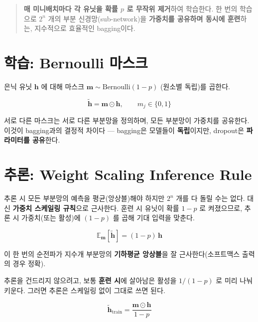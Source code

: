 \documentclass[
  letterpaper,
  DIV=11,
  numbers=noendperiod]{scrreprt}
\begin{document}
\begin{quote}
\textbf{매 미니배치마다 각 유닛을 확률 \(p\) 로 무작위 제거}하여
학습한다. 한 번의 학습으로 \(2^n\) 개의 부분 신경망(sub-network)을
\textbf{가중치를 공유하며 동시에 훈련}하는, 지수적으로 효율적인
bagging이다.
\end{quote}

\section{학습: Bernoulli
마스크}\label{uxd559uxc2b5-bernoulli-uxb9c8uxc2a4uxd06c}

은닉 유닛 \(\bm{h}\) 에 대해 마스크 \(\bm{m}\sim\text{Bernoulli}(1-p)\)
(원소별 독립)를 곱한다.

\[
\tilde{\bm{h}} = \bm{m}\odot\bm{h}, \qquad m_j\in\{0,1\}
\]

서로 다른 마스크는 서로 다른 부분망을 정의하며, 모든 부분망이 가중치를
공유한다. 이것이 bagging과의 결정적 차이다 --- bagging은 모델들이
\textbf{독립}이지만, dropout은 \textbf{파라미터를 공유}한다.

\section{추론: Weight Scaling Inference
Rule}\label{uxcd94uxb860-weight-scaling-inference-rule}

추론 시 모든 부분망의 예측을 평균(앙상블)해야 하지만 \(2^n\) 개를 다
돌릴 수는 없다. 대신 \textbf{가중치 스케일링 규칙}으로 근사한다. 훈련 시
유닛이 확률 \(1-p\) 로 켜졌으므로, 추론 시 가중치(또는 활성)에 \((1-p)\)
를 곱해 기대 입력을 맞춘다.

\[
\mathbb{E}_{\bm{m}}[\tilde{\bm{h}}] = (1-p)\,\bm{h}
\]

이 한 번의 순전파가 지수개 부분망의 \textbf{기하평균 앙상블}을 잘
근사한다(소프트맥스 출력의 경우 정확).

\begin{tcolorbox}[enhanced jigsaw, arc=.35mm, bottomrule=.15mm, bottomtitle=1mm, breakable, colback=white, colbacktitle=quarto-callout-tip-color!10!white, colframe=quarto-callout-tip-color-frame, coltitle=black, left=2mm, leftrule=.75mm, opacityback=0, opacitybacktitle=0.6, rightrule=.15mm, title=\textcolor{quarto-callout-tip-color}{\faLightbulb}\hspace{0.5em}{Inverted Dropout (실무 표준)}, titlerule=0mm, toprule=.15mm, toptitle=1mm]

추론을 건드리지 않으려고, 보통 \textbf{훈련 시}에 살아남은 활성을
\(1/(1-p)\) 로 미리 나눠 키운다. 그러면 추론은 스케일링 없이 그대로 쓰면
된다.

\[
\tilde{\bm{h}}_{\text{train}} = \frac{\bm{m}\odot\bm{h}}{1-p}
\]

\end{tcolorbox}
\end{document}
